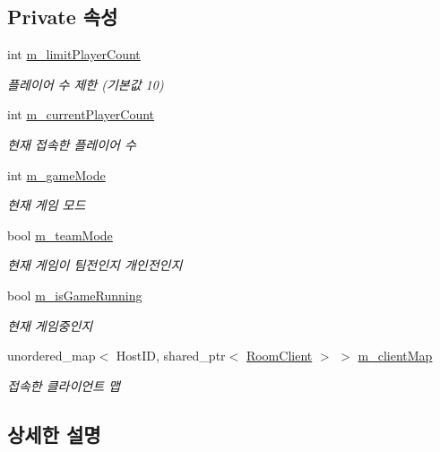 \subsection*{Private 속성}
\begin{DoxyCompactItemize}
\item 
int \hyperlink{class_game_room_ae03c39da189ee9097af8ee4cde8ba373}{m\+\_\+limit\+Player\+Count}
\begin{DoxyCompactList}\small\item\em 플레이어 수 제한 (기본값 10) \end{DoxyCompactList}\item 
int \hyperlink{class_game_room_a36763ea909947d8d02dd2a00ee835e10}{m\+\_\+current\+Player\+Count}
\begin{DoxyCompactList}\small\item\em 현재 접속한 플레이어 수 \end{DoxyCompactList}\item 
int \hyperlink{class_game_room_a47c8f21ede7fd6fa526ebfcb069dcf45}{m\+\_\+game\+Mode}
\begin{DoxyCompactList}\small\item\em 현재 게임 모드 \end{DoxyCompactList}\item 
bool \hyperlink{class_game_room_aef7875998ee1bf83eb23e249b5659bc7}{m\+\_\+team\+Mode}
\begin{DoxyCompactList}\small\item\em 현재 게임이 팀전인지 개인전인지 \end{DoxyCompactList}\item 
bool \hyperlink{class_game_room_afd3dbeca203aed6a441449ce8a640d15}{m\+\_\+is\+Game\+Running}
\begin{DoxyCompactList}\small\item\em 현재 게임중인지 \end{DoxyCompactList}\item 
unordered\+\_\+map$<$ Host\+ID, shared\+\_\+ptr$<$ \hyperlink{class_room_client}{Room\+Client} $>$ $>$ \hyperlink{class_game_room_afc202a511605453216f7dd870ff96c5c}{m\+\_\+client\+Map}
\begin{DoxyCompactList}\small\item\em 접속한 클라이언트 맵 \end{DoxyCompactList}\end{DoxyCompactItemize}


\subsection{상세한 설명}


